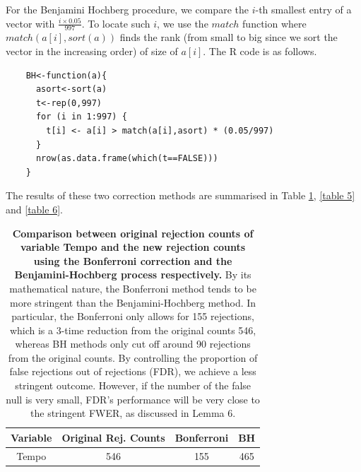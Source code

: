 \documentclass[12pt]{article}
\theoremstyle{plain}
\theoremstyle{definition}
\theoremstyle{remark}
\begin{document}
For the Benjamini Hochberg procedure, we compare the $i$-th smallest entry of a vector with $\frac{i\times 0.05}{997}$. To locate such $i$, we use the $match$ function where $match(a[i],sort(a))$ finds the rank (from small to big since we sort the vector in the increasing order) of size of $a[i]$. The R code is as follows.
\begin{verbatim}
    BH<-function(a){
      asort<-sort(a)
      t<-rep(0,997)
      for (i in 1:997) {
        t[i] <- a[i] > match(a[i],asort) * (0.05/997)
      }
      nrow(as.data.frame(which(t==FALSE)))
    }
\end{verbatim}

The results of these two correction methods are summarised in Table \ref{table 4}, \ref{table 5} and \ref{table 6}.


\begin{table}[h!]
    \centering
    \begin{tabular}{|c|c|c|c|}
        \hline
        Variable & Original Rej. Counts & Bonferroni & BH\\
        \hline
        Tempo & 546 & 155 & 465\\
        \hline
    \end{tabular}
    \caption{\textbf{Comparison between original rejection counts of variable Tempo and the new rejection counts using the Bonferroni correction and the Benjamini-Hochberg process respectively.} By its mathematical nature, the Bonferroni method tends to be more stringent than the Benjamini-Hochberg method. In particular, the Bonferroni only allows for 155 rejections, which is a 3-time reduction from the original counts 546, whereas BH methods only cut off around 90 rejections from the original counts. By controlling the proportion of false rejections out of rejections (FDR), we achieve a less stringent outcome. However, if the number of the false null is very small, FDR's performance will be very close to the stringent FWER, as discussed in Lemma 6.}
    \label{table 4}
\end{table}
\end{document}
